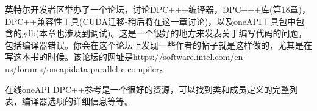 英特尔开发者区举办了一个论坛，讨论DPC+++编译器，DPC+++库(第18章)，DPC++兼容性工具(CUDA迁移-稍后将在这一章讨论)，以及oneAPI工具包中包含的gdb(本章也涉及到调试)。这是一个很好的地方来发表关于编写代码的问题，包括编译器错误。你会在这个论坛上发现一些作者的帖子就是这样做的，尤其是在写这本书的时候。该论坛的网址是https://software.intel.com/en-us/forums/oneapidata-parallel-c-compiler。\par

在线oneAPI DPC++参考是一个很好的资源，可以找到类和成员定义的完整列表，编译器选项的详细信息等等。\par